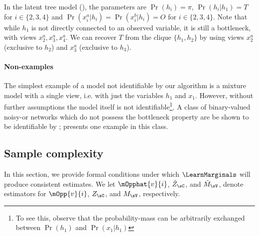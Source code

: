 In the latent tree model (), the parameters
are $\Pr(h_i) = \pi$, $\Pr(h_i | h_1) = T$ for $i \in \{2,3,4\}$
and $\Pr(x^a_i | h_i) = \Pr(x^b_i | h_i) = O$ for $i \in \{2,3,4\}$.
Note that while $h_1$ is not directly connected to an observed variable,
  it is still a bottleneck, with views $x^a_2, x^a_3, x^a_4$.
We can recover $T$ from the clique $\{h_1, h_2\}$ by using views $x^a_2$
  (exclusive to $h_2$) and $x^a_3$ (exclusive to $h_3$).


\paragraph{Non-examples}
\label{sec:non-example}

The simplest example of a model not identifiable by our algorithm is
  a mixture model with a single view, i.e.  with
  just the variables $h_1$ and $x_1$.
However, without further assumptions the model itself is not
  identifiable\footnote{To see this, observe that the probability-mass
  can be arbitrarily exchanged between $\Pr(h_1)$ and $\Pr(x_1 | h_1)$}.
A class of binary-valued noisy-or networks which do not possess the
  bottleneck property are be shown to be identifiable by
  \citet{halpern13noisyor}; 
 presents one example in this class.

\subsection{Sample complexity}
\label{sec:sampleComplexity}

In this section, we provide formal conditions under which $\LearnMarginals$
will produce consistent estimates.
We let
$\mOpphat{v}{i}$,
$\hat Z_\sC$,
and $\hat M_\sV$,
denote estimators for
$\mOpp{v}{i}$,
$Z_\sC$,
and $M_\sV$,
respectively.


